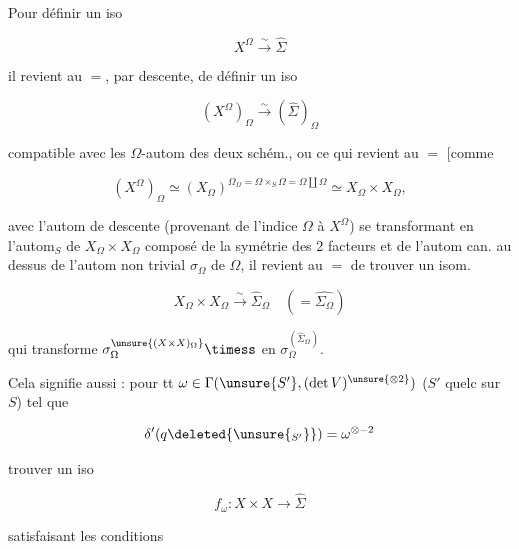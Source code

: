 
Pour définir un iso

\[
X^\Omega\xrightarrow{\sim}\hat\Sigma
\]

il revient au $=$, par descente, de définir un iso

\[
(X^\Omega)_\Omega\xrightarrow{\sim}(\hat\Sigma)_\Omega
\]

compatible avec les $\Omega$-autom des deux schém., ou ce qui revient au $=$ [comme

\[
(X^\Omega)_\Omega\simeq(X_\Omega)^{\Omega_\Omega=\Omega\times_S\Omega=\Omega\amalg\Omega}\simeq X_\Omega\times X_\Omega,
\]

avec l'autom de descente (provenant de l'indice $\Omega$ à $X^\Omega$) se transformant en  l'autom$_{\!S}$ de $X_\Omega\times X_\Omega$ composé de la symétrie des 2 facteurs et de l'autom can. au dessus de l'autom non trivial $\sigma_\Omega$ de $\Omega$, il revient au $=$ de trouver un isom.

\[
X_\Omega\times X_\Omega\xrightarrow{\sim}\hat\Sigma_\Omega\quad(=\widehat{\Sigma_\Omega})
\]

qui transforme $\sigma_\Omega^{\unsure{(X\times X)_\Omega}}\timess$ en $\sigma_\Omega^{(\hat\Sigma_\Omega)}$.

Cela signifie aussi : pour tt $\omega\in\Gamma(\unsure{S'},(\det V)^{\unsure{\otimes2}})$ ($S'$ quelc sur $S$) tel que

\[
\delta'(q\deleted{\unsure{_{S'}}})=\omega^{\otimes-2}
\]

trouver un iso

\[
f_\omega:X\times X\longrightarrow\hat\Sigma\tag*{$(*)$}
\]

 satisfaisant les conditions


